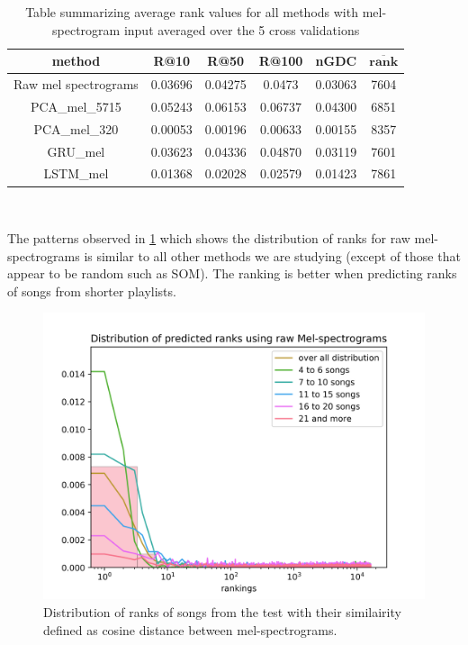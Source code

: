 \begin{table}[h!]
\centering
\renewcommand{\arraystretch}{1.5}
\begin{tabu} to 1\textwidth { | c || c | c | c | c | c |}
 \hline
 \textbf{method} & \textbf{R@10} & \textbf{R@50} & \textbf{R@100} & \textbf{nGDC} & $ \boldsymbol{\overline{rank}} $ \\
 \hline
 \hline
 Raw mel spectrograms & 0.03696 & 0.04275 & 0.0473 & 0.03063 & 7604 \\
 \hline
 PCA_mel_5715 & 0.05243 & 0.06153 & 0.06737 & 0.04300 & 6851 \\
 \hline
 PCA_mel_320 & 0.00053 & 0.00196 & 0.00633 & 0.00155 & 8357 \\
 \hline
 GRU_mel  & 0.03623 & 0.04336 & 0.04870 & 0.03119 & 7601 \\
 \hline
 LSTM_mel & 0.01368 & 0.02028 & 0.02579 & 0.01423 & 7861\\
 \hline
\end{tabu} \\
\caption{Table summarizing average rank values for all methods with mel-spectrogram input averaged over the 5 cross validations}
\label{table:mel_spec_methods}
\end{table}
  
The patterns observed in \ref{fig:mel_graph} which shows the distribution of ranks for raw mel-spectrograms is similar to all other methods we are studying (except of those that appear to be random such as SOM). The ranking is better when predicting ranks of songs from shorter playlists. 

\begin{figure}[h]
    \centering
	\includegraphics[width=120mm]{./img/mel_graph.png}
	\caption{Distribution of ranks of songs from the test with their similairity defined as cosine distance between mel-spectrograms.}
	\label{fig:mel_graph}
\end{figure}

